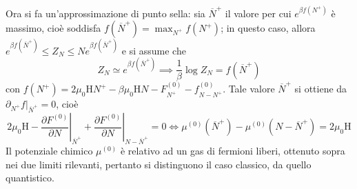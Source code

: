 \documentclass[11pt, a4paper]{scrartcl}
\theoremstyle{style}
\theoremstyle{style1}
\newcommand*\Eval[3]{\left.#1\right\rvert_{#2}^{#3}}
\numberwithin{equation}{subsection}
\begin{document}
Ora si fa un'approssimazione di punto sella: sia $\overline{N}^+$ il valore per cui $e^{\beta f(N^+)}$ \`e massimo, cio\`e soddisfa $f(\overline{N}^+) = \max_{N^+} f(N^+)$; in questo caso, allora $e^{\beta f(\overline{N}^+)} \le Z_N \le N e^{\beta f(\overline{N}^+)}$ e si assume che 
\[
Z_N \simeq e^{\beta f(\overline{N}^+)}\implies \frac{1}{\beta }\log Z_N = f(\overline{N}^+)
\] 
con $f(N^+) = 2\mu _0 \mathrm{H} N^+ - \beta \mu _0 \mathrm{H} N - F_{N^+} ^{(0)}- f_{N-N^+} ^{(0)}$.
Tale valore $\overline{N}^+$ si ottiene da $\partial _{N^+} f |_{\overline{N}^+} =0$, cio\`e
\[
	2\mu _0 \mathrm{H} - \Eval{\frac{\partial F^{(0)}}{\partial N} }{\overline{N}^+}{} + \Eval{\frac{\partial F^{(0)}}{\partial N} }{N-\overline{N}^+}{} = 0 \iff \mu ^{(0)}(\overline{N}^+) - \mu ^{(0)} (N-\overline{N}^+) = 2\mu _0 \mathrm{H} 
\] 
Il potenziale chimico $\mu ^{(0)}$ \`e relativo ad un gas di fermioni liberi, ottenuto sopra nei due limiti rilevanti, pertanto si distinguono il caso classico, da quello quantistico.
\end{document}
